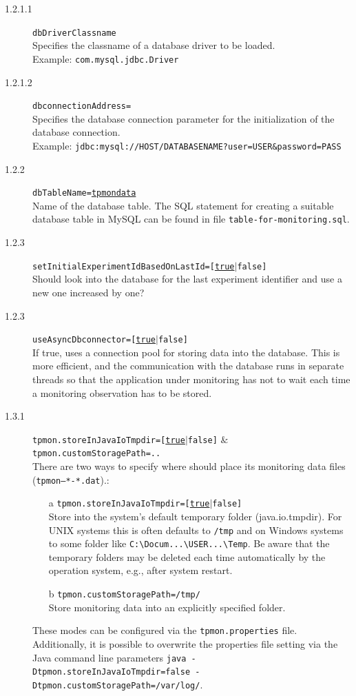 \documentclass[a4paper,12pt]{scrartcl}
\begin{document}
\begin{description}
\item [1.2.1.1] \texttt{dbDriverClassname} \\
Specifies the classname of a database driver to be loaded.\\ Example:
{\small\texttt{com.mysql.jdbc.Driver}}
\item [1.2.1.2] \texttt{dbconnectionAddress=} \\
Specifies the database connection parameter for the initialization of the database connection.\\ Example:
\small
\texttt{jdbc:mysql://HOST/DATABASENAME?user=USER\&password=PASS}
\normalsize
\item [1.2.2] \texttt{dbTableName=\underline{tpmondata}} \\
Name of the database table. The SQL statement for creating a suitable database table in MySQL can be found in file \small \texttt{table-for-monitoring.sql}\normalsize.
\item [1.2.3] \texttt{setInitialExperimentIdBasedOnLastId=[\underline{true}$|$false]} \\
Should \tpmon{} look into the database for the last experiment identifier and use a new one increased by one?
\item [1.2.3] \texttt{useAsyncDbconnector=[\underline{true}$|$false]} \\
If true, \tpmon{} uses a connection pool for storing data into the database. This is more efficient, and the communication with the database runs in separate threads so that the application under monitoring has not to wait each time a monitoring observation has to be stored.
\item [1.3.1] \footnotesize \texttt{tpmon.storeInJavaIoTmpdir=[\underline{true}$|$false]} $\&$ \texttt{tpmon.customStoragePath=..} \normalsize \\
There are two ways to specify where \tpmon{} should place its monitoring data files (\texttt{tpmon--*-*.dat}).:
\begin{enumerate}
\item [a] \texttt{tpmon.storeInJavaIoTmpdir=[\underline{true}$|$false]} \\ Store into the system's default temporary folder (java.io.tmpdir). For UNIX systems this is often defaults to \texttt{/tmp} and on Windows systems to some folder like \verb=C:\Docum...\USER...\Temp=. Be aware that the temporary folders may be deleted each time automatically by the operation system, e.g., after system restart.
\item [b] \texttt{tpmon.customStoragePath=/tmp/} \\ Store monitoring data into an explicitly specified folder.
\end{enumerate}
These modes can be configured via the \texttt{tpmon.properties} file. Additionally, it is possible to overwrite the properties file setting via the Java command line parameters \footnotesize \texttt{java -Dtpmon.storeInJavaIoTmpdir=false -Dtpmon.customStoragePath=/var/log/}. \normalsize


\end{description}
\end{document}
